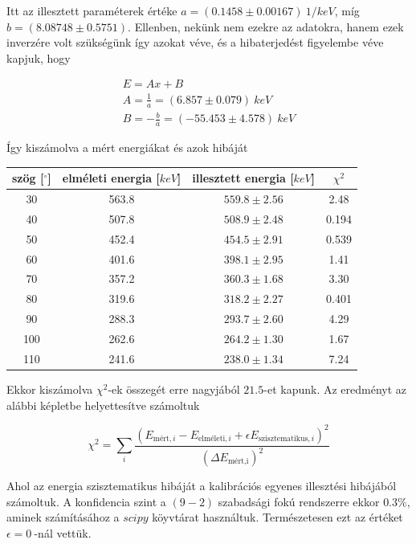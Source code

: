 \documentclass[a4paper,12pt]{article}
\begin{document}
\par Itt az illesztett paraméterek értéke $a = (0.1458 \pm 0.00167) ~{1/keV}$, míg $b = (8.08748 \pm 0.5751)$. Ellenben, nekünk nem ezekre az adatokra, hanem ezek inverzére volt szükségünk így azokat véve, és a hibaterjedést figyelembe véve kapjuk, hogy

\begin{gather*}
	E = A x + B \\
	A = \frac{1}{a} = (6.857 \pm 0.079) ~keV \\
	B = -\frac{b}{a} = (-55.453 \pm 4.578) ~keV
\end{gather*}

\par Így kiszámolva a mért energiákat és azok hibáját

\begin{center}
\begin{tabular}{|c| c| c| c|}\hline

szög [$^{\circ}$] & elméleti energia [$keV$]& illesztett energia [$keV$]& $\chi^2$ \\ \hline
30 &563.8 &$559.8\pm2.56$&2.48 \\\hline
40 &507.8 &$508.9\pm2.48$&0.194 \\\hline
50 &452.4 &$454.5\pm2.91$&0.539\\\hline
60&401.6 &$398.1\pm2.95$&1.41\\\hline
70&357.2 &$360.3\pm1.68 $&3.30\\\hline
80& 319.6&$318.2\pm2.27$&0.401\\\hline
90& 288.3&$293.7\pm2.60$ &4.29\\\hline
100&262.6 &$264.2\pm1.30$&1.67\\\hline
110&241.6 &$238.0\pm1.34$&7.24\\\hline


\end{tabular}
\end{center}

\par Ekkor kiszámolva $\chi^{2}$-ek összegét erre nagyjából $21.5$-et kapunk. Az eredményt az alábbi képletbe helyettesítve számoltuk

\begin{equation*}
	\chi^{2} = \sum_{i}\frac{(E_{\text{mért}, i} - E_{\text{elméleti}, i} + \epsilon E_{\text{szisztematikus} , i})^{2}}{(\Delta E_{\text{mért,i}})^{2}}
\end{equation*}

\par Ahol az energia szisztematikus hibáját a kalibrációs egyenes illesztési hibájából számoltuk. A konfidencia szint a $(9-2)$ szabadsági fokú rendszerre ekkor $0.3\%$, aminek számításához a $scipy$ köyvtárat használtuk. Természetesen ezt az értéket $\epsilon = 0~$-nál vettük.
\end{document}
